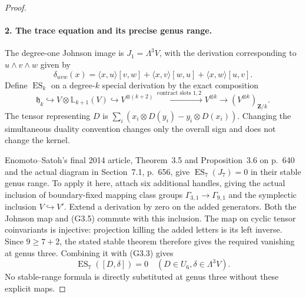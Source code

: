 \begin{proof}
\paragraph{2. The trace equation and its precise genus range.}
The degree-one Johnson image is
$J_1=\Lambda^3V$, with the derivation corresponding to
$u\wedge v\wedge w$ given by
\[
 \delta_{uvw}(x)=\langle x,u\rangle[v,w]
                +\langle x,v\rangle[w,u]
                +\langle x,w\rangle[u,v].                 \tag{G3.4}
\]
Define $\operatorname{ES}_k$ on a degree-$k$ special
derivation by the exact composition
\[
 \mathfrak h_k\hookrightarrow V\otimes\mathbb L_{k+1}(V)
 \hookrightarrow V^{\otimes(k+2)}
 \xrightarrow{\,\text{contract slots }1,2\,}V^{\otimes k}
 \longrightarrow (V^{\otimes k})_{\mathbf Z/k}.             \tag{G3.5}
\]
The tensor representing $D$ is
$\sum_i(x_i\otimes D(y_i)-y_i\otimes D(x_i))$.
Changing the simultaneous duality convention changes
only the overall sign and does not change the kernel.

Enomoto--Satoh's final 2014 article\cite{AuditEnomotoSatoh2014}, Theorem~3.5 and
Proposition~3.6 on p.~640 and the actual diagram in
Section~7.1, p.~656, give
$\operatorname{ES}_7(J_7)=0$ in their stable genus
range. To apply it here, attach six additional handles,
giving the actual inclusion of boundary-fixed mapping
class groups $\Gamma_{3,1}\to\Gamma_{9,1}$ and the
symplectic inclusion $V\hookrightarrow V'$. Extend a
derivation by zero on the added generators. Both the
Johnson map and (G3.5) commute with this inclusion.
The map on cyclic tensor coinvariants is injective:
projection killing the added letters is its left
inverse. Since $9\geq7+2$, the stated stable theorem
therefore gives the required vanishing at genus three.
Combining it with (G3.3) gives
\[
       \operatorname{ES}_7([D,\delta])=0
       \quad(D\in U_6, \delta\in\Lambda^3V).              \tag{G3.6}
\]
No stable-range formula is directly substituted at
genus three without these explicit maps.


\end{proof}
